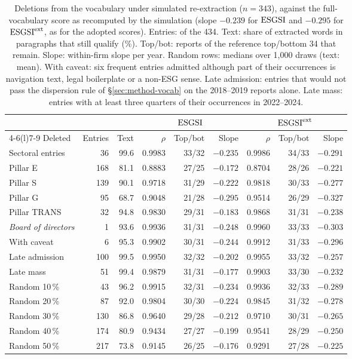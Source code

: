 \begin{table}[tbp]
\centering
\small
\setlength{\tabcolsep}{4pt}
\caption{Deletions from the vocabulary under simulated re-extraction
($n = 343$), against the full-vocabulary score as recomputed by the simulation
(slope $-0.239$ for $\mathrm{ESGSI}$ and $-0.295$ for $\mathrm{ESGSI}^{\mathrm{ext}}$, as for the adopted
scores). Entries: of the 434. Text: share of extracted words
in paragraphs that still qualify (\%). Top/bot: reports of the reference
top/bottom 34 that remain. Slope: within-firm slope per year. Random rows:
medians over 1{,}000 draws (text: mean). With caveat: six frequent entries
admitted although part of their occurrences is navigation text, legal
boilerplate or a non-ESG sense. Late admission: entries that would not pass
the dispersion rule of \S\ref{sec:method-vocab} on the 2018--2019 reports
alone. Late mass: entries with at least three quarters of their occurrences in
2022--2024.}
\label{tab:robustness-summary}
\begin{tabular}{@{}lrrrrrrrr@{}}
\toprule
 & & & \multicolumn{3}{c}{$\mathrm{ESGSI}$} & \multicolumn{3}{c}{$\mathrm{ESGSI}^{\mathrm{ext}}$} \\
\cmidrule(lr){4-6}\cmidrule(l){7-9}
Deleted & Entries & Text & $\rho$ & Top/bot & Slope & $\rho$ & Top/bot & Slope \\
\midrule
Sectoral entries   & 36  & 99.6 & 0.9983 & 33/32 & $-0.235$ & 0.9986 & 34/33 & $-0.291$ \\
Pillar E           & 168 & 81.1 & 0.8883 & 27/25 & $-0.172$ & 0.8704 & 28/26 & $-0.221$ \\
Pillar S           & 139 & 90.1 & 0.9718 & 31/29 & $-0.222$ & 0.9818 & 30/33 & $-0.277$ \\
Pillar G           & 95  & 68.7 & 0.9048 & 21/28 & $-0.295$ & 0.9514 & 26/29 & $-0.327$ \\
Pillar TRANS       & 32  & 94.8 & 0.9830 & 29/31 & $-0.183$ & 0.9868 & 31/31 & $-0.238$ \\
\emph{Board of directors} & 1 & 93.6 & 0.9936 & 31/31 & $-0.248$ & 0.9960 & 33/33 & $-0.303$ \\
With caveat        & 6   & 95.3 & 0.9902 & 30/31 & $-0.244$ & 0.9912 & 31/33 & $-0.296$ \\
Late admission     & 100 & 99.5 & 0.9950 & 32/32 & $-0.202$ & 0.9955 & 33/32 & $-0.257$ \\
Late mass          & 51  & 99.4 & 0.9879 & 31/31 & $-0.177$ & 0.9903 & 33/30 & $-0.232$ \\
\addlinespace
Random 10\,\%      & 43  & 96.2 & 0.9915 & 32/31 & $-0.234$ & 0.9936 & 32/33 & $-0.289$ \\
Random 20\,\%      & 87  & 92.0 & 0.9804 & 30/30 & $-0.224$ & 0.9845 & 31/32 & $-0.278$ \\
Random 30\,\%      & 130 & 86.8 & 0.9640 & 29/28 & $-0.212$ & 0.9710 & 30/31 & $-0.265$ \\
Random 40\,\%      & 174 & 80.9 & 0.9434 & 27/27 & $-0.199$ & 0.9541 & 28/29 & $-0.250$ \\
Random 50\,\%      & 217 & 73.8 & 0.9145 & 26/25 & $-0.176$ & 0.9291 & 27/28 & $-0.225$ \\
\bottomrule
\end{tabular}
\end{table}

